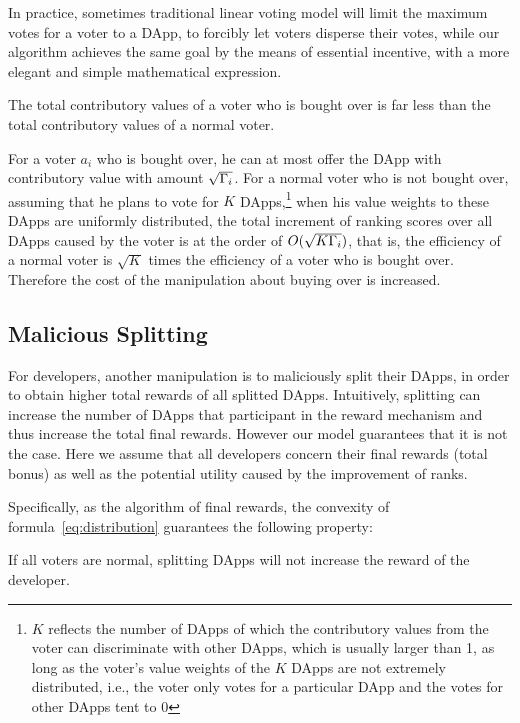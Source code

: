In practice, sometimes traditional  linear voting model will limit the maximum votes for a voter to a DApp, to forcibly let voters disperse their votes, while our algorithm achieves the same goal by the means of essential incentive, with a more elegant and simple mathematical expression.


\begin{corollary}
	The total contributory values of a  voter who is bought over is far less than the total contributory values of a normal voter.
\end{corollary}
For a voter $a_i$ who is bought over, he can at most offer the DApp with contributory value with amount $\sqrt{\Gamma_i}$. For a normal voter who is not bought over, assuming that he plans to vote for $K$ DApps,\footnote{$K$ reflects the number of DApps of which the contributory values from the voter can discriminate with other DApps, which is usually larger than 1, as long as the voter's value weights of the $K$ DApps are not extremely distributed, i.e., the voter only votes for a particular DApp and the votes for other DApps tent to 0} when  his value weights to these DApps are uniformly distributed, the total increment of ranking scores  over all DApps caused by the voter is at the order of $O(\sqrt{K\Gamma_i})$, that is, the efficiency of a normal voter is $\sqrt{K}$ times the efficiency of a voter who is bought over. Therefore the cost of the manipulation about buying over is increased.

\subsection{Malicious Splitting}
\label{subsec:5.2}
\noindent For developers, another manipulation is to maliciously split their DApps, in order to obtain higher total rewards of all splitted DApps. Intuitively, splitting can increase the number of DApps that participant in the reward mechanism and thus increase the total final rewards. However our model guarantees that it is not the case. Here we assume that all developers concern their final rewards (total bonus) as well as the potential utility caused by the improvement of ranks.

Specifically, as the algorithm of final rewards, the convexity of formula~\ref{eq:distribution} guarantees the following property:
\begin{property}
	\label{p2}
    If all voters are normal, splitting DApps will not increase the reward of the developer.
\end{property}

